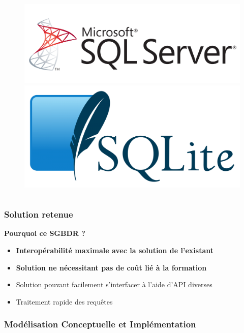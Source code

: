 \begin{frame}
\begin{columns}
\begin{column}{7cm}
\begin{figure}
\includegraphics[scale=0.052]{Images/MsSqlServer}
\includegraphics[scale=0.052]{Images/SQLite}
\end{figure}
\end{column}
\end{columns}
\end{frame}

\begin{frame}
\frametitle{Solution retenue}
\begin{block}{\textbf{Pourquoi ce SGBDR ?}}
\begin{itemize}
 \item<2-> \textbf{Interopérabilité maximale avec la solution de l'existant}
 \item<3-> \textbf{Solution ne nécessitant pas de coût lié à la formation}
 \item<4-> Solution pouvant facilement s'interfacer à l'aide d'API diverses
 \item<5-> Traitement rapide des requêtes
\end{itemize}
\end{block}
\end{frame}

\subsubsection{Modélisation Conceptuelle et Implémentation}

